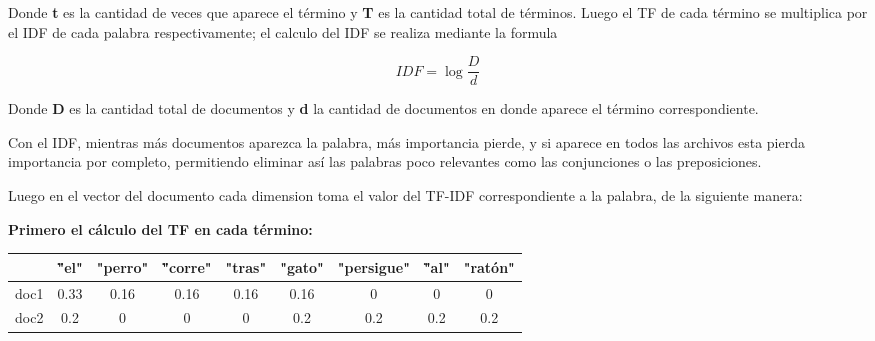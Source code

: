 \documentclass[10pt]{article}
\begin{document}
Donde \large\textbf{t}\normalsize\hspace{1pt} es la cantidad de veces que aparece el término y \large\textbf{T}\normalsize\hspace{1pt} es la cantidad total de términos. Luego el TF de cada término se multiplica por el IDF de cada palabra respectivamente; el calculo del IDF se realiza mediante la formula

\Huge
\begin{equation*}		
	IDF = \log{\frac{D}{d}}
\end{equation*}
\normalsize

\vspace{1cm}

Donde \large\textbf{D}\normalsize\hspace{1pt} es la cantidad total de documentos y \large\textbf{d}\normalsize\hspace{1pt} la cantidad de documentos en donde aparece el término correspondiente.

Con el IDF, mientras más documentos aparezca la palabra, más importancia pierde, y si aparece en todos las archivos esta pierda importancia por completo, permitiendo eliminar así las palabras poco relevantes como las conjunciones o las preposiciones.

\vspace{.2cm}

Luego en el vector del documento cada dimension toma el valor del TF-IDF
correspondiente a la palabra, de la siguiente manera:

\vspace{.2cm}
\textbf{Primero el cálculo del TF en cada término:}

\begin{table}[h]
	\centering
	\bfseries \textcolor[RGB]{50,50,50}{
		\begin{tabular}{|c|c|c|c|c|c|c|c|c|}
			\hline
			\rowcolor[RGB]{200,200,200}
			& \""el" & "perro" & \""corre" & "tras" & "gato" & "persigue" & \""al" & "ratón" \\
			\hline
			\rowcolor[RGB]{200,200,200}
			doc1 & 0.33 & 0.16 & 0.16 & 0.16 & 0.16 & 0 & 0 & 0 \\
			\hline
			\rowcolor[RGB]{200,200,200}
			doc2 & 0.2 & 0 & 0 & 0 & 0.2 & 0.2 & 0.2 & 0.2 \\
			\hline
		\end{tabular}
	}
\end{table}
\end{document}
